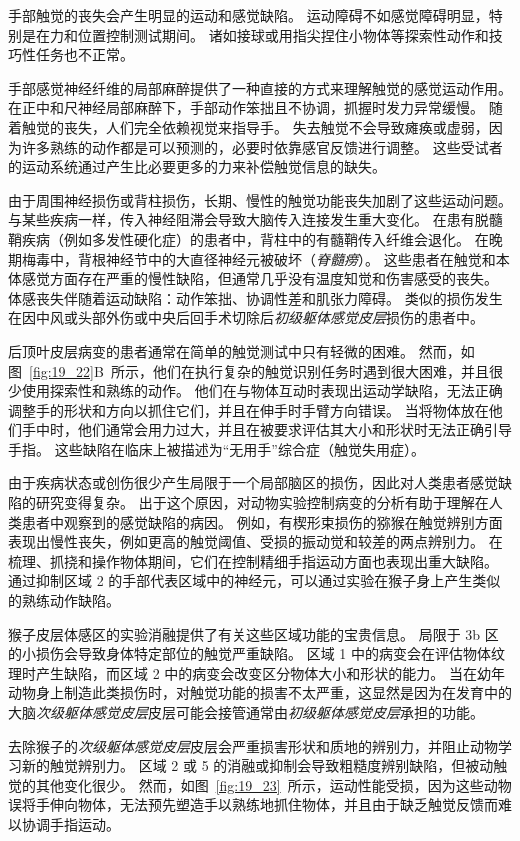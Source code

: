 手部触觉的丧失会产生明显的运动和感觉缺陷。
运动障碍不如感觉障碍明显，特别是在力和位置控制测试期间。
诸如接球或用指尖捏住小物体等探索性动作和技巧性任务也不正常。


手部感觉神经纤维的局部麻醉提供了一种直接的方式来理解触觉的感觉运动作用。
在正中和尺神经局部麻醉下，手部动作笨拙且不协调，抓握时发力异常缓慢。
随着触觉的丧失，人们完全依赖视觉来指导手。
失去触觉不会导致瘫痪或虚弱，因为许多熟练的动作都是可以预测的，必要时依靠感官反馈进行调整。
这些受试者的运动系统通过产生比必要更多的力来补偿触觉信息的缺失。


由于周围神经损伤或背柱损伤，长期、慢性的触觉功能丧失加剧了这些运动问题。
与某些疾病一样，传入神经阻滞会导致大脑传入连接发生重大变化。
在患有脱髓鞘疾病（例如多发性硬化症）的患者中，背柱中的有髓鞘传入纤维会退化。
在晚期梅毒中，背根神经节中的大直径神经元被破坏（\textit{脊髓痨}）。
这些患者在触觉和本体感觉方面存在严重的慢性缺陷，但通常几乎没有温度知觉和伤害感受的丧失。
体感丧失伴随着运动缺陷：动作笨拙、协调性差和肌张力障碍。
类似的损伤发生在因中风或头部外伤或中央后回手术切除后\textit{初级躯体感觉皮层}损伤的患者中。


后顶叶皮层病变的患者通常在简单的触觉测试中只有轻微的困难。
然而，如图~\ref{fig:19_22}B~所示，他们在执行复杂的触觉识别任务时遇到很大困难，并且很少使用探索性和熟练的动作。
他们在与物体互动时表现出运动学缺陷，无法正确调整手的形状和方向以抓住它们，并且在伸手时手臂方向错误。 
当将物体放在他们手中时，他们通常会用力过大，并且在被要求评估其大小和形状时无法正确引导手指。
这些缺陷在临床上被描述为“无用手”综合症（触觉失用症）。


由于疾病状态或创伤很少产生局限于一个局部脑区的损伤，因此对人类患者感觉缺陷的研究变得复杂。
出于这个原因，对动物实验控制病变的分析有助于理解在人类患者中观察到的感觉缺陷的病因。
例如，有楔形束损伤的猕猴在触觉辨别方面表现出慢性丧失，例如更高的触觉阈值、受损的振动觉和较差的两点辨别力。
在梳理、抓挠和操作物体期间，它们在控制精细手指运动方面也表现出重大缺陷。
通过抑制区域 2 的手部代表区域中的神经元，可以通过实验在猴子身上产生类似的熟练动作缺陷。


猴子皮层体感区的实验消融提供了有关这些区域功能的宝贵信息。
局限于 3b 区的小损伤会导致身体特定部位的触觉严重缺陷。
区域 1 中的病变会在评估物体纹理时产生缺陷，而区域 2 中的病变会改变区分物体大小和形状的能力。
当在幼年动物身上制造此类损伤时，对触觉功能的损害不太严重，这显然是因为在发育中的大脑\textit{次级躯体感觉皮层}皮层可能会接管通常由\textit{初级躯体感觉皮层}承担的功能。


去除猴子的\textit{次级躯体感觉皮层}皮层会严重损害形状和质地的辨别力，并阻止动物学习新的触觉辨别力。
区域 2 或 5 的消融或抑制会导致粗糙度辨别缺陷，但被动触觉的其他变化很少。
然而，如图~\ref{fig:19_23}~所示，运动性能受损，因为这些动物误将手伸向物体，无法预先塑造手以熟练地抓住物体，并且由于缺乏触觉反馈而难以协调手指运动。


